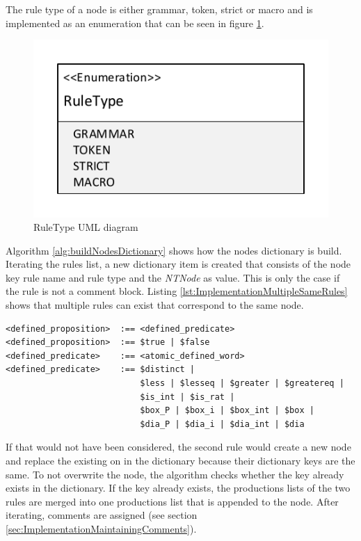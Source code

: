 The rule type of a node is either grammar, token, strict or macro and is implemented as an enumeration that can be seen in figure \ref{fig:ImplementationRuleTypeUML}. 

\begin{figure}[H]
\centering
\includegraphics[width=.7\textwidth]{images/uml_data_types_rule_type.pdf}
\caption{RuleType UML diagram}
\label{fig:ImplementationRuleTypeUML}
\end{figure}

Algorithm \ref{alg:buildNodesDictionary} shows how the nodes dictionary is build. Iterating the rules list, a new dictionary item is created that consists of the node key rule name and rule type and the \textit{NTNode} as value. This is only the case if the rule is not a comment block. 
Listing \ref{lst:ImplementationMultipleSameRules} shows that multiple rules can exist that correspond to the same node.

\begin{lstlisting}[language=None, basicstyle=\scriptsize	,caption= Multiple rules with the same left-hand side of the rule,label= lst:ImplementationMultipleSameRules]
<defined_proposition>  :== <defined_predicate>
<defined_proposition>  :== $true | $false
<defined_predicate>    :== <atomic_defined_word>
<defined_predicate>    :== $distinct |
                           $less | $lesseq | $greater | $greatereq |
                           $is_int | $is_rat |
                           $box_P | $box_i | $box_int | $box |
                           $dia_P | $dia_i | $dia_int | $dia
\end{lstlisting}

If that would not have been considered, the second rule would create a new node and replace the existing on in the dictionary because their dictionary keys are the same. To not overwrite the node, the algorithm checks whether the key already exists in the dictionary. If the key already exists, the productions lists of the two rules are merged into one productions list that is appended to the node. 
After iterating, comments are assigned (see section \ref{sec:ImplementationMaintainingComments}).

